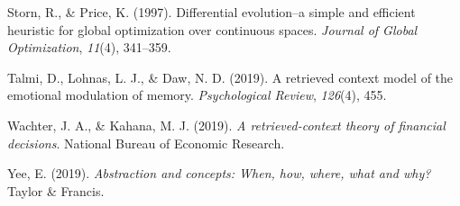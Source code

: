\documentclass[
  letterpaper,
  DIV=11]{article}
\newlength{\cslhangindent}
\newlength{\cslentryspacingunit} %
\newenvironment{CSLReferences}[2] %
 {%
  \setlength{\parindent}{0pt}
  \ifodd #1
  \let\oldpar\par
  \def\par{\hangindent=\cslhangindent\oldpar}
  \fi
  \setlength{\parskip}{#2\cslentryspacingunit}
 }%
 {}
\begin{document}
\begin{CSLReferences}{1}{0}
\leavevmode{}%
Storn, R., \& Price, K. (1997). Differential evolution--a simple and
efficient heuristic for global optimization over continuous spaces.
\emph{Journal of Global Optimization}, \emph{11}(4), 341--359.

\leavevmode{}%
Talmi, D., Lohnas, L. J., \& Daw, N. D. (2019). A retrieved context
model of the emotional modulation of memory. \emph{Psychological
Review}, \emph{126}(4), 455.

\leavevmode{}%
Wachter, J. A., \& Kahana, M. J. (2019). \emph{A retrieved-context
theory of financial decisions}. National Bureau of Economic Research.

\leavevmode{}%
Yee, E. (2019). \emph{Abstraction and concepts: When, how, where, what
and why?} Taylor \& Francis.

\end{CSLReferences}
\end{document}
